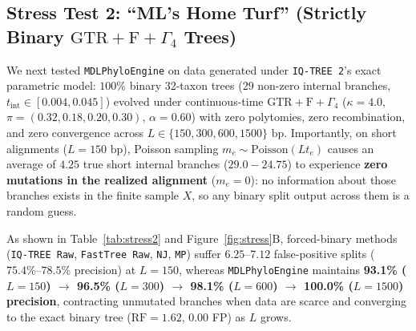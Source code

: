 \documentclass[11pt,a4paper]{article}
\begin{document}
\subsection{Stress Test 2: ``ML's Home Turf'' (Strictly Binary $\text{GTR}+\text{F}+\Gamma_4$ Trees)}

We next tested \texttt{MDLPhyloEngine} on data generated under \texttt{IQ-TREE 2}'s exact parametric model: $100\%$ binary 32-taxon trees ($29$ non-zero internal branches, $t_{\text{int}} \in [0.004, 0.045]$) evolved under continuous-time $\text{GTR}+\text{F}+\Gamma_4$ ($\kappa = 4.0$, $\pi = (0.32, 0.18, 0.20, 0.30)$, $\alpha = 0.60$) with zero polytomies, zero recombination, and zero convergence across $L \in \{150, 300, 600, 1500\}\text{ bp}$. Importantly, on short alignments ($L=150\text{ bp}$), Poisson sampling $m_e \sim \text{Poisson}(L t_e)$ causes an average of $4.25$ true short internal branches ($29.0 - 24.75$) to experience \textbf{zero mutations in the realized alignment} ($m_e = 0$): no information about those branches exists in the finite sample $X$, so any binary split output across them is a random guess.

As shown in Table~\ref{tab:stress2} and Figure~\ref{fig:stress}B, forced-binary methods (\texttt{IQ-TREE Raw}, \texttt{FastTree Raw}, \texttt{NJ}, \texttt{MP}) suffer $6.25\text{--}7.12$ false-positive splits ($75.4\%\text{--}78.5\%$ precision) at $L=150$, whereas \texttt{MDLPhyloEngine} maintains \textbf{93.1\% ($L=150$) $\to$ 96.5\% ($L=300$) $\to$ 98.1\% ($L=600$) $\to$ 100.0\% ($L=1500$) precision}, contracting unmutated branches when data are scarce and converging to the exact binary tree ($\text{RF} = 1.62$, $0.00$ FP) as $L$ grows.
\end{document}
